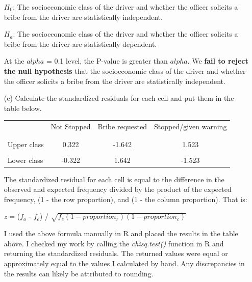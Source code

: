 \documentclass[12pt,letterpaper]{article}
\begin{document}
\begin{enumerate}
	$H_0$: The socioeconomic class of the driver and whether the officer solicits a bribe from the driver are statistically independent.
	
	$H_a$: The socioeconomic class of the driver and whether the officer solicits a bribe from the driver are statistically dependent. \vspace{0.5cm}
	
	At the $alpha$ = 0.1 level, the P-value is greater than $alpha$. We \textbf{fail to reject the null hypothesis} that the socioeconomic class of the driver and whether the officer solicits a bribe from the driver are statistically independent.
	
	\newpage
	\item [(c)] Calculate the standardized residuals for each cell and put them in the table below.
	
	\begin{table}[h]
		\centering
		\begin{tabular}{l | c c c }
			& Not Stopped & Bribe requested & Stopped/given warning \\
			\\[-1.8ex] 
			\hline \\[-1.8ex]
			Upper class  & 0.322 &  -1.642 & 1.523 \\
			\\
			Lower class & -0.322 & 1.642 & -1.523  \\
			
		\end{tabular}
	\end{table}
	
  \vspace{0.5cm}

The standardized residual for each cell is equal to the difference in the observed and expected frequency divided by the product of the expected frequency, (1 - the row proportion), and (1 - the column proportion). That is: \vspace{0.5cm}

\textit{z} = ($f_o$ - $f_e$) / $\sqrt{f_e(1 - proportion_r)(1 - proportion_c)}$ \vspace{0.5cm}

I used the above formula manually in R and placed the results in the table above. I checked my work by calling the \textit{chisq.test()} function in R and returning the standardized residuals. The returned values were equal or approximately equal to the values I calculated by hand. Any discrepancies in the results can likely be attributed to rounding. \vspace{0.5cm}


\end{enumerate}
\end{document}
